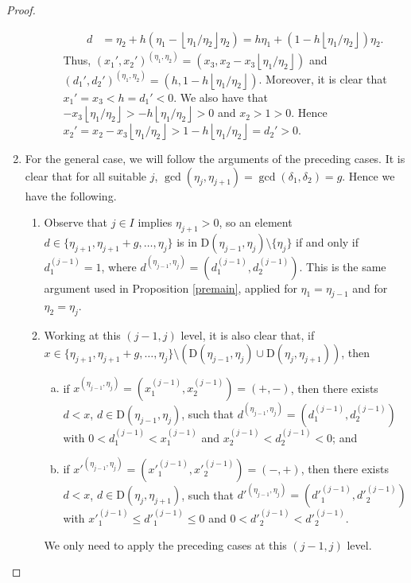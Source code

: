 \documentclass[11pt]{amsart}
\theoremstyle{remark}
\newcommand{\peb}[1]{\left\lfloor {#1}\right\rfloor}
\begin{document}
\begin{proof}
\begin{enumerate}[(1)]
\begin{enumerate}[(a)]
\begin{enumerate}[(i)]
\begin{align*}
        	d & =  \eta_2+h(\eta_1-\peb{{\eta_1}/{\eta_2}}\eta_2) = h\eta_1+(1-h\peb{{\eta_1}/{\eta_2}})\eta_2. 
        	\end{align*}
        	Thus, $(x_1',x_2')^{(\eta_1,\eta_2)}=(x_3,x_2-x_3\peb{{\eta_1}/{\eta_2}})$ and $(d_1',d_2')^{(\eta_1,\eta_2)}=(h,1-h\peb {{\eta_1}/{\eta_2}})$. Moreover, it is clear that $x_1'=x_3<h=d_1'<0$.
        	We also have that $-x_3\peb {{\eta_1}/{\eta_2}} > -h\peb{{\eta_1}/{\eta_2}}>0$ and $x_2>1>0$. Hence  $x_2'=x_2-x_3\peb {{\eta_1}/{\eta_2}}>1-h\peb {{\eta_1}/{\eta_2}}=d_2'>0$. %
     \end{enumerate}
    \end{enumerate}    
        \item For the general case, we will follow the arguments of the preceding cases. It is clear that for all suitable $j$,  $\gcd(\eta_j,\eta_{j+1})= \gcd(\delta_1,\delta_2)=g$. Hence we have the following.
          \begin{enumerate}[$\bullet$]
          	\item Observe that $j\in I$ implies $\eta_{j+1}>0$, so an element $d\in\{\eta_{j+1},\eta_{j+1}+g,\ldots ,\eta_{j}\}$ is in $\mathrm D(\eta_{j-1},\eta_j)\setminus \{\eta_j\}$ if and only if $d^{(j-1)}_1=1$, where   $d^{(\eta_{j-1},\eta_j)}= (d^{(j-1)}_1,d^{(j-1)}_2)$. This is the same argument used in Proposition \ref{premain}, applied for $\eta_1=\eta_{j-1}$ and for $\eta_2=\eta_j$.  
          	\item Working at this $(j-1,j)$ level, it is also clear that, if $x\in \{\eta_{j+1},\eta_{j+1}+g,\ldots, \eta_{j}\}\setminus (\mathrm D(\eta_{j-1},\eta_j)\cup \mathrm D(\eta_j,\eta_{j+1}))$, then 
          	\begin{enumerate}[(a)]
          		\item if $x^{(\eta_{j-1},\eta_j)}=(x^{(j-1)}_1,x^{(j-1)}_2)=(+,-)$, then there exists $d<x$, $d\in \mathrm D(\eta_{j-1},\eta_{j})$, such that $d^{(\eta_{j-1},\eta_j)}=(d^{(j-1)}_1,d^{(j-1)}_2)$ with $0<d^{(j-1)}_1<x^{(j-1)}_1$ and $x^{(j-1)}_2<d^{(j-1)}_2<0$; and
          		\item if $x'^{(\eta_{j-1},\eta_j)}=(x'^{(j-1)}_1,x'^{(j-1)}_2)=(-,+)$, then there exists $d<x$, $d\in \mathrm D(\eta_{j},\eta_{j+1})$, such that $d'^{(\eta_{j-1},\eta_j)}=(d'^{(j-1)}_1,d'^{(j-1)}_2)$ with $x'^{(j-1)}_1\le d'^{(j-1)}_1\le 0$ and $0<d'^{(j-1)}_2<d'^{(j-1)}_2$.
          	\end{enumerate}
          	We only need to apply the preceding cases at this $(j-1,j)$ level.
          \end{enumerate}

\end{enumerate}
\end{proof}
\end{document}
